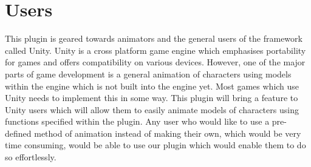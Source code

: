 \section{Users}
This plugin is geared towards animators and the general users of the framework called Unity. Unity is a cross platform game engine which emphasises portability for games and offers compatibility on various devices. However, one of the major parts of game development is a general animation of characters using models within the engine which is not built into the engine yet. Most games which use Unity needs to implement this in some way. This plugin will bring a feature to Unity users which will allow them to easily animate models of characters using functions specified within the plugin. Any user who would like to use a pre-defined method of animation instead of making their own, which would be very time consuming, would be able to use our plugin which would enable them to do so effortlessly.
